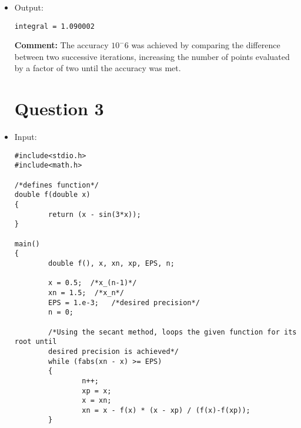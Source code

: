 \documentclass[10pt]{article}
\begin{document}
\begin{itemize}
\begin{verbatim}
int main() {
        double x, a, b, h, exact, ans, prevans, EPS, sum;
        int i, n;
        
        a = 0;          //lower bound
        b = 2.0;	//upper bound
        EPS = 1.e-6;	//desired precision
        ans = 1.e50;	//starting point to keep below loop running
        
        printf ("       h         ans         (ans - prevans)/h^4\n");
        
        n = 1;
        
        /*iterates Simpson's rule with a greater number of measuring points
        until desired precision is achieved.*/
        while (fabs(ans - prevans) > EPS) 
        { 
                h = (b - a) / n;
                prevans = ans;
                
                ans = simp(f, a, b, n);
                n *= 2;
        }
        printf("integral = %.6f \n", ans);
        
return 0;
}
\end{verbatim}
\item Output:
\begin{verbatim}
integral = 1.090002
\end{verbatim}
\textbf{Comment:} The accuracy $10^-6$ was achieved by comparing the difference between two successive iterations, increasing the number of points evaluated by a factor of two until the accuracy was met.

\section*{Question 3}
\item Input:
\begin{verbatim}
#include<stdio.h>
#include<math.h>

/*defines function*/
double f(double x)
{
        return (x - sin(3*x));
}

main()
{
        double f(), x, xn, xp, EPS, n;
        
        x = 0.5;  /*x_(n-1)*/
        xn = 1.5;  /*x_n*/
        EPS = 1.e-3;   /*desired precision*/
        n = 0;
        
        /*Using the secant method, loops the given function for its root until 
        desired precision is achieved*/
        while (fabs(xn - x) >= EPS)
        {
                n++;
                xp = x;
                x = xn;
                xn = x - f(x) * (x - xp) / (f(x)-f(xp));
        }
        

\end{verbatim}
\end{itemize}
\end{document}
